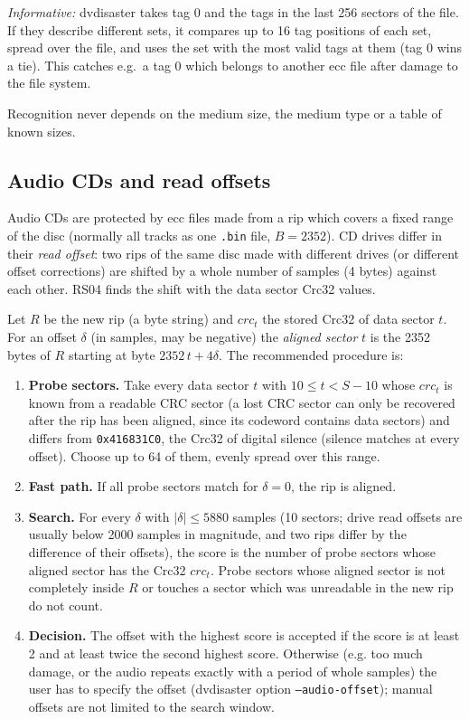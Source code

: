 {\em Informative:} dvdisaster takes tag 0 and the tags in the last 256
sectors of the file. If they describe different sets, it compares up to 16
tag positions of each set, spread over the file, and uses the set with the
most valid tags at them (tag 0 wins a tie). This catches e.g.\ a tag 0
which belongs to another ecc file after damage to the file system.

\medskip

Recognition never depends on the medium size, the medium type or a table of
known sizes.

\subsection{Audio CDs and read offsets}
\label{rs04-audio}

Audio CDs are protected by ecc files made from a rip which covers a fixed
range of the disc (normally all tracks as one {\tt .bin} file, $B = 2352$).
CD drives differ in their {\em read offset}: two rips of the same disc made
with different drives (or different offset corrections) are shifted by a
whole number of samples (4 bytes) against each other. RS04 finds the shift
with the data sector Crc32 values.

\medskip

Let $R$ be the new rip (a byte string) and $crc_t$ the stored Crc32 of data
sector $t$. For an offset $\delta$ (in samples, may be negative) the
{\em aligned sector} $t$ is the 2352 bytes of $R$ starting at byte
$2352\,t + 4\delta$. The recommended procedure is:

\begin{enumerate}
\item {\bf Probe sectors.} Take every data sector $t$ with
  $10 \le t < S - 10$ whose $crc_t$ is known from a readable CRC sector
  (a lost CRC sector can only be recovered after the rip has been aligned,
  since its codeword contains data sectors) and differs from {\tt 0x416831C0}, the Crc32 of digital
  silence (silence matches at every offset). Choose up to 64 of them, evenly
  spread over this range.
\item {\bf Fast path.} If all probe sectors match for $\delta = 0$, the rip
  is aligned.
\item {\bf Search.} For every $\delta$ with $|\delta| \le 5880$ samples
  (10 sectors; drive read offsets are usually below 2000 samples in
  magnitude, and two rips differ by the difference of their offsets), the score is the
  number of probe sectors whose aligned sector has the Crc32 $crc_t$. Probe
  sectors whose aligned sector is not completely inside $R$ or touches a
  sector which was unreadable in the new rip do not count.
\item {\bf Decision.} The offset with the highest score is accepted if the
  score is at least 2 and at least twice the second highest score. Otherwise
  (e.g. too much damage, or the audio repeats exactly with a period of whole
  samples) the user has to specify the offset (dvdisaster option
  {\tt --audio-offset}); manual offsets are not limited to the search window.
\end{enumerate}

